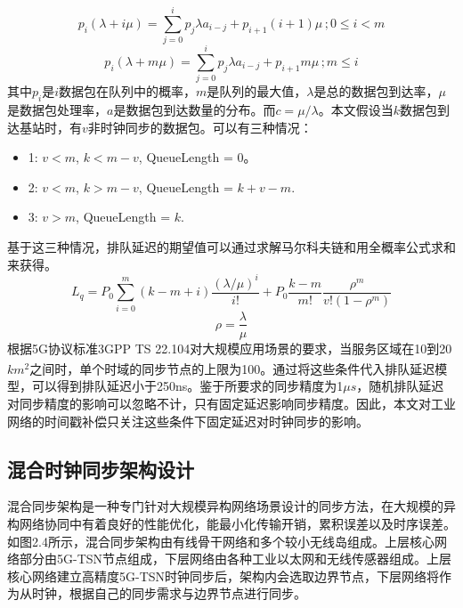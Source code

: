 \documentclass[UTF8,a4paper,12pt]{ctexart}
\numberwithin{equation}{section}
\begin{document}
	\begin{equation*}
		p_i\left( \lambda +i \mu \right) =\sum_{j=0}^i{p_j \lambda  a_{i-j}+p_{i+1}\left( i+1 \right)  \mu\, ; 0\leqslant i<m}
	\end{equation*}
	\begin{equation}
		p_i\left( \lambda +m \mu \right) =\sum_{j=0}^i{p_j \lambda  a_{i-j}+p_{i+1}m \mu}\,; m\leqslant i
	\end{equation}
	其中$p_i$是$i$数据包在队列中的概率，$m$是队列的最大值，$\lambda$是总的数据包到达率，$\mu$是数据包处理率，$a$是数据包到达数量的分布。而$c=\mu/\lambda $。本文假设当$k$数据包到达基站时，有$v$非时钟同步的数据包。可以有三种情况：
	\begin{itemize}
		\item 1: $v<m$, $k<m-v$, QueueLength = 0。
		\item 2: $v<m$, $k>m-v$, QueueLength = $k+v-m$.
		\item 3: $v>m$, QueueLength = $k$.
	\end{itemize}
	
	基于这三种情况，排队延迟的期望值可以通过求解马尔科夫链和用全概率公式求和来获得。
	\begin{equation*}
		L_q=P_0 \sum_{i=0}^m{\left(k-m+i\right) \frac{\left(\lambda/\mu\right)^i}{i!}+P_0 \frac{k-m}{m!} \frac{\rho^m}{v!\left(1-\rho^m\right)}}
	\end{equation*}
	\begin{equation}
		\rho=\frac{\lambda}{\mu}
	\end{equation}
	根据5G协议标准3GPP TS 22.104对大规模应用场景的要求，当服务区域在10到20$km^2$之间时，单个时域的同步节点的上限为100\textsuperscript{\cite{888889}}。通过将这些条件代入排队延迟模型，可以得到排队延迟小于250ns。鉴于所要求的同步精度为1$\mu s$，随机排队延迟对同步精度的影响可以忽略不计，只有固定延迟影响同步精度。因此，本文对工业网络的时间戳补偿只关注这些条件下固定延迟对时钟同步的影响。
	
	\subsection{混合时钟同步架构设计}
	
	混合同步架构是一种专门针对大规模异构网络场景设计的同步方法，在大规模的异构网络协同中有着良好的性能优化，能最小化传输开销，累积误差以及时序误差。如图2.4所示，混合同步架构由有线骨干网络和多个较小无线岛组成。上层核心网络部分由5G-TSN节点组成，下层网络由各种工业以太网和无线传感器组成。上层核心网络建立高精度5G-TSN时钟同步后，架构内会选取边界节点，下层网络将作为从时钟，根据自己的同步需求与边界节点进行同步。
	
\end{document}
